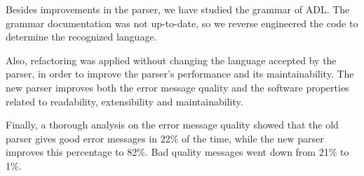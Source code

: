 Besides improvements in the parser, we have studied the grammar of ADL.
The grammar documentation was not up-to-date, so we reverse engineered the code to determine the recognized language.

Also, refactoring was applied without changing the language accepted by the parser, in order to improve the parser's performance and its maintainability.
The new parser improves both the error message quality and the software properties related to readability, extensibility and maintainability.

Finally, a thorough analysis on the error message quality showed that the old parser gives good error messages in 22\% of the time, while the new parser improves this percentage to 82\%.
Bad quality messages went down from 21\% to 1\%.
